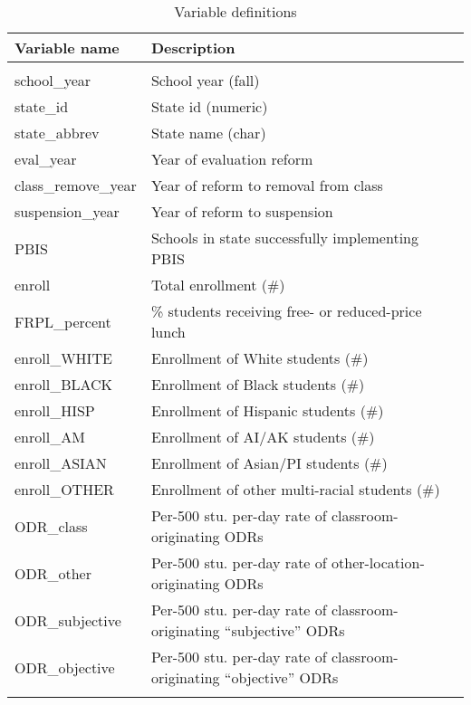 \begin{table}[!htbp]
\centering
\caption{\label{tab:dictionary} Variable definitions}
\begin{tabular}{ll}
\hline \hline
Variable name & Description \\
\hline  \\[-1.8ex]
school\_year 		& School year (fall) 		\\
state\_id			& State id (numeric)		\\
state\_abbrev		& State name (char)			\\
eval\_year			& Year of evaluation reform	\\
class\_remove\_year & Year of reform to removal from class \\
suspension\_year	& Year of reform to suspension	\\
PBIS				& Schools in state successfully implementing PBIS \\
enroll				& Total enrollment (\#)		\\
FRPL\_percent		& \% students receiving free- or reduced-price lunch \\
enroll\_WHITE		& Enrollment of White students (\#)		\\
enroll\_BLACK		& Enrollment of Black students (\#)		\\
enroll\_HISP		& Enrollment of Hispanic students (\#)	\\
enroll\_AM			& Enrollment of AI/AK students (\#)		\\
enroll\_ASIAN		& Enrollment of Asian/PI students (\#)	\\
enroll\_OTHER		& Enrollment of other multi-racial students (\#) \\
ODR\_class			& Per-500 stu. per-day rate of classroom-originating ODRs \\
ODR\_other			& Per-500 stu. per-day rate of other-location-originating ODRs \\
ODR\_subjective		& Per-500 stu. per-day rate of classroom-originating ``subjective'' ODRs \\
ODR\_objective		& Per-500 stu. per-day rate of classroom-originating ``objective'' ODRs \\

\hline \hline 
\\
\end{tabular}
\end{table}


